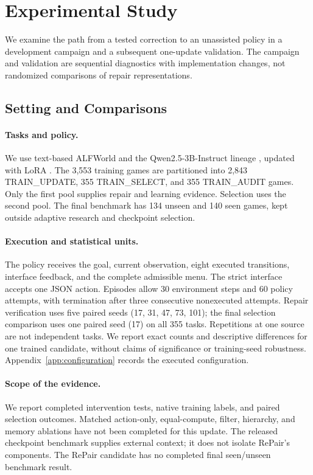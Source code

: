 \section{Experimental Study}
\label{sec:experimental-setup}
We examine the path from a tested correction to an unassisted policy in a
development campaign and a subsequent one-update validation. The campaign
and validation are sequential diagnostics with implementation changes,
not randomized comparisons of repair representations.

\subsection{Setting and Comparisons}
\label{sec:experiment-design}
\paragraph{Tasks and policy.}
We use text-based ALFWorld \citep{shridhar2021alfworld} and the
Qwen2.5-3B-Instruct lineage \citep{qwen2025report}, updated with LoRA
\citep{hu2021lora}. The 3,553 training games are partitioned into 2,843
TRAIN\_UPDATE, 355 TRAIN\_SELECT, and 355 TRAIN\_AUDIT games. Only the
first pool supplies repair and learning evidence. Selection uses the
second pool. The final benchmark has 134 unseen and 140 seen games,
kept outside adaptive research and checkpoint selection.

\paragraph{Execution and statistical units.}
The policy receives the goal, current observation, eight executed
transitions, interface feedback, and the complete admissible menu. The
strict interface accepts one JSON action. Episodes allow 30 environment
steps and 60 policy attempts, with termination after three consecutive
nonexecuted attempts. Repair verification uses five paired seeds
(17, 31, 47, 73, 101); the final selection comparison uses one paired seed
(17) on all 355 tasks. Repetitions at one source are not independent
tasks. We report exact counts and descriptive differences for one trained
candidate, without claims of significance or training-seed robustness.
Appendix~\ref{app:configuration} records the executed configuration.

\paragraph{Scope of the evidence.}
We report completed intervention tests, native training labels, and paired
selection outcomes. Matched action-only, equal-compute, filter, hierarchy,
and memory ablations have not been completed for this update. The released
checkpoint benchmark supplies external context; it does not isolate
RePair's components. The RePair candidate has no completed final
seen/unseen benchmark result.

